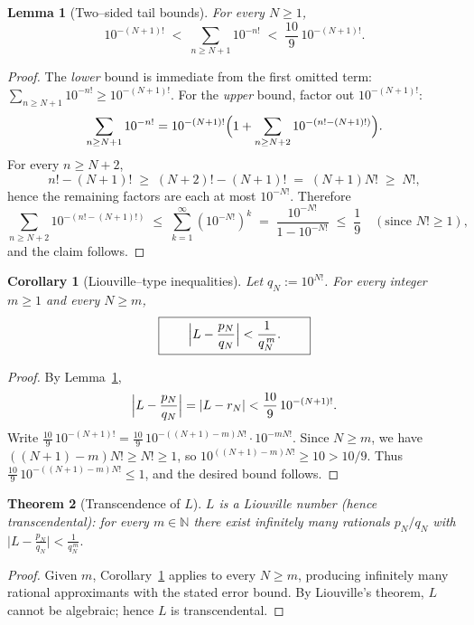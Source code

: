 \documentclass[11pt,a4paper]{article}
\newtheorem{theorem}{Theorem}
\newtheorem{corollary}[theorem]{Corollary}
\theoremstyle{definition}
\theoremstyle{definition}
\theoremstyle{plain}
\newtheorem{lemma}[exercise]{Lemma}
\theoremstyle{remark}
\begin{document}
\begin{lemma}[Two–sided tail bounds]\label{lem:two-sided-tail}
	For every $N\ge1$,
	\[
	\boxed{\qquad
		10^{-(N+1)!}
		\;<\;
		\sum_{n\ge N+1} 10^{-n!}
		\;<\;
		\frac{10}{9}\,10^{-(N+1)!}.
		\qquad}
	\]
\end{lemma}

\begin{proof}
	The \emph{lower} bound is immediate from the first omitted term:
	$\sum_{n\ge N+1}10^{-n!} \ge 10^{-(N+1)!}$.
	For the \emph{upper} bound, factor out $10^{-(N+1)!}$:
	\[
	\sum_{n\ge N+1}10^{-n!}
	= 10^{-(N+1)!}\Bigl(1+\sum_{n\ge N+2}10^{-(n!-(N+1)!)}\Bigr).
	\]
	For every $n\ge N+2$,
	\[
	n!-(N+1)!\;\ge\;(N+2)!-(N+1)!\;=\;(N+1)N!\;\ge\;N!,
	\]
	hence the remaining factors are each at most $10^{-N!}$. Therefore
	\[
	\sum_{n\ge N+2}10^{-(n!-(N+1)!)}
	\;\le\; \sum_{k=1}^{\infty} (10^{-N!})^{k}
	\;=\; \frac{10^{-N!}}{1-10^{-N!}}
	\;\le\; \frac1{9}\quad(\text{since }N!\ge1),
	\]
	and the claim follows.
\end{proof}

\begin{corollary}[Liouville–type inequalities]\label{cor:Liouville-ineq}
	Let $q_N:=10^{N!}$. For every integer $m\ge1$ and every $N\ge m$,
	\[
	\boxed{\qquad
		\Bigl|L-\frac{p_N}{q_N}\Bigr|
		< \frac{1}{q_N^{\,m}}.
		\qquad}
	\]
\end{corollary}

\begin{proof}
	By Lemma~\ref{lem:two-sided-tail},
	\[
	\Bigl|L-\frac{p_N}{q_N}\Bigr|
	=|L-r_N|
	< \frac{10}{9}\,10^{-(N+1)!}.
	\]
	Write
	\(
	\frac{10}{9}\,10^{-(N+1)!}
	= \frac{10}{9}\,10^{-((N+1)-m)N!}\cdot 10^{-mN!}.
	\)
	Since $N\ge m$, we have $((N+1)-m)N!\ge N!\ge1$, so
	\(10^{((N+1)-m)N!}\ge 10 > 10/9\).
	Thus \(\frac{10}{9}\,10^{-((N+1)-m)N!}\le 1\), and the desired bound follows.
\end{proof}

\begin{theorem}[Transcendence of $L$]\label{thm:L-transcendental}
	$L$ is a Liouville number (hence transcendental): for every $m\in\mathbb N$ there exist
	infinitely many rationals $p_N/q_N$ with
	\(
	\bigl|L-\frac{p_N}{q_N}\bigr|<\frac{1}{q_N^{\,m}}.
	\)
\end{theorem}

\begin{proof}
	Given $m$, Corollary~\ref{cor:Liouville-ineq} applies to every $N\ge m$,
	producing infinitely many rational approximants with the stated error bound.
	By Liouville's theorem, $L$ cannot be algebraic; hence $L$ is transcendental.
\end{proof}
\end{document}

